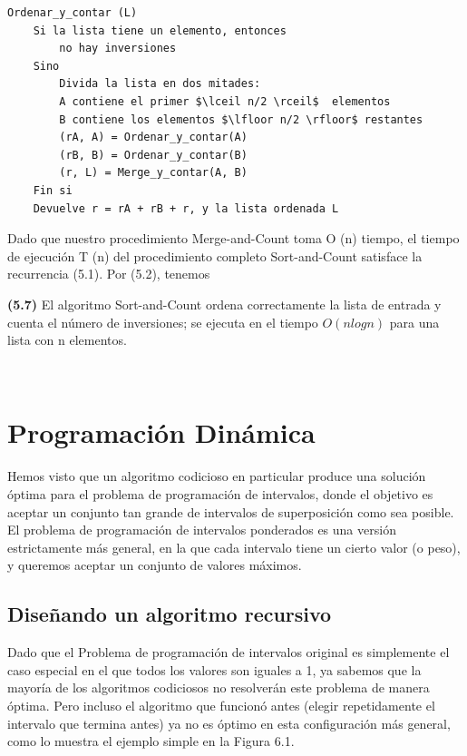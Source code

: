 \documentclass[a4paper]{article}
\begin{document}
\begin{lstlisting}
Ordenar_y_contar (L)
    Si la lista tiene un elemento, entonces
        no hay inversiones
    Sino
        Divida la lista en dos mitades:
        A contiene el primer $\lceil n/2 \rceil$  elementos
        B contiene los elementos $\lfloor n/2 \rfloor$ restantes
        (rA, A) = Ordenar_y_contar(A)
        (rB, B) = Ordenar_y_contar(B)
        (r, L) = Merge_y_contar(A, B)
    Fin si
    Devuelve r = rA + rB + r, y la lista ordenada L
\end{lstlisting}

Dado que nuestro procedimiento Merge-and-Count toma O (n) tiempo, el tiempo de ejecución T (n) del procedimiento completo Sort-and-Count satisface la recurrencia (5.1). Por (5.2), tenemos\\


\colorbox{mygray}{\parbox{15cm}{
\textbf{(5.7)} El algoritmo Sort-and-Count ordena correctamente la lista de entrada y cuenta el número de inversiones; se ejecuta en el tiempo $O (n log n)$ para una lista con n elementos.}}\\

\newpage

\section{Programación Dinámica}

Hemos visto que un algoritmo codicioso en particular produce una solución óptima para el problema de programación de intervalos, donde el objetivo es aceptar un conjunto tan grande de intervalos de superposición como sea posible. El problema de programación de intervalos ponderados es una versión estrictamente más general, en la que cada intervalo tiene un cierto valor (o peso), y queremos aceptar un conjunto de valores máximos.\\

\subsection{Diseñando un algoritmo recursivo}

Dado que el Problema de programación de intervalos original es simplemente el caso especial en el que todos los valores son iguales a 1, ya sabemos que la mayoría de los algoritmos codiciosos no resolverán este problema de manera óptima. Pero incluso el algoritmo que funcionó antes (elegir repetidamente el intervalo que termina antes) ya no es óptimo en esta configuración más general, como lo muestra el ejemplo simple en la Figura 6.1.\\
\end{document}
